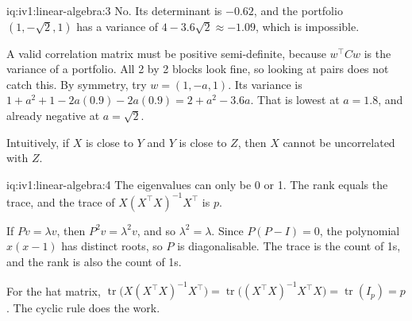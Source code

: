 \begin{solution}{iq:iv1:linear-algebra:3}
No. Its determinant is $-0.62$, and the portfolio $(1, -\sqrt{2}, 1)$ has a variance of $4 - 3.6\sqrt{2} \approx -1.09$, which is impossible.

A valid correlation matrix must be positive semi-definite, because $w^\top Cw$ is the variance of a portfolio. All 2 by 2 blocks look fine, so looking at pairs does not catch this. By symmetry, try $w = (1, -a, 1)$. Its variance is $1 + a^2 + 1 - 2a(0.9) - 2a(0.9) = 2 + a^2 - 3.6a$. That is lowest at $a = 1.8$, and already negative at $a = \sqrt{2}$.

Intuitively, if $X$ is close to $Y$ and $Y$ is close to $Z$, then $X$ cannot be uncorrelated with $Z$.

\end{solution}

\begin{solution}{iq:iv1:linear-algebra:4}
The eigenvalues can only be 0 or 1. The rank equals the trace, and the trace of $X(X^\top X)^{-1}X^\top$ is $p$.

If $Pv = \lambda v$, then $P^2v = \lambda^2v$, and so $\lambda^2 = \lambda$. Since $P(P - I) = 0$, the polynomial $x(x - 1)$ has distinct roots, so $P$ is diagonalisable. The trace is the count of 1s, and the rank is also the count of 1s.

For the hat matrix, $\operatorname{tr}\bigl(X(X^\top X)^{-1}X^\top\bigr) = \operatorname{tr}\bigl((X^\top X)^{-1}X^\top X\bigr) = \operatorname{tr}(I_p) = p$. The cyclic rule does the work.

\end{solution}

